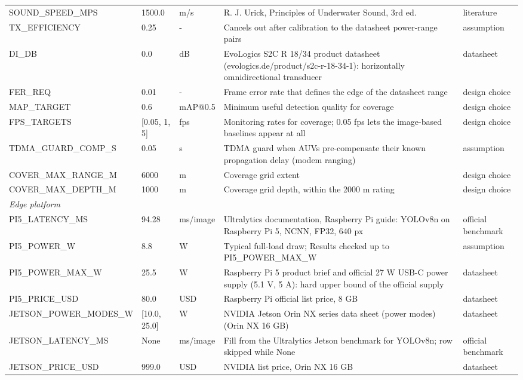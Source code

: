 \begin{table}[t]
\begin{tabular}{p{3.3cm}p{2.6cm}p{1.6cm}p{6.6cm}p{2.0cm}}
SOUND\_SPEED\_MPS & 1500.0 & m/s & R. J. Urick, Principles of Underwater Sound, 3rd ed. & literature \\
TX\_EFFICIENCY & 0.25 & - & Cancels out after calibration to the datasheet power-range pairs & assumption \\
DI\_DB & 0.0 & dB & EvoLogics S2C R 18/34 product datasheet (evologics.de/product/s2c-r-18-34-1): horizontally omnidirectional transducer & datasheet \\
FER\_REQ & 0.01 & - & Frame error rate that defines the edge of the datasheet range & design choice \\
MAP\_TARGET & 0.6 & mAP@0.5 & Minimum useful detection quality for coverage & design choice \\
FPS\_TARGETS & [0.05, 1, 5] & fps & Monitoring rates for coverage; 0.05 fps lets the image-based baselines appear at all & design choice \\
TDMA\_GUARD\_COMP\_S & 0.05 & s & TDMA guard when AUVs pre-compensate their known propagation delay (modem ranging) & assumption \\
COVER\_MAX\_RANGE\_M & 6000 & m & Coverage grid extent & design choice \\
COVER\_MAX\_DEPTH\_M & 1000 & m & Coverage grid depth, within the 2000 m rating & design choice \\
\multicolumn{5}{l}{\textit{Edge platform}} \\
PI5\_LATENCY\_MS & 94.28 & ms/image & Ultralytics documentation, Raspberry Pi guide: YOLOv8n on Raspberry Pi 5, NCNN, FP32, 640 px & official benchmark \\
PI5\_POWER\_W & 8.8 & W & Typical full-load draw; Results checked up to PI5\_POWER\_MAX\_W & assumption \\
PI5\_POWER\_MAX\_W & 25.5 & W & Raspberry Pi 5 product brief and official 27 W USB-C power supply (5.1 V, 5 A): hard upper bound of the official supply & datasheet \\
PI5\_PRICE\_USD & 80.0 & USD & Raspberry Pi official list price, 8 GB & datasheet \\
JETSON\_POWER\_MODES\_W & [10.0, 25.0] & W & NVIDIA Jetson Orin NX series data sheet (power modes) (Orin NX 16 GB) & datasheet \\
JETSON\_LATENCY\_MS & None & ms/image & Fill from the Ultralytics Jetson benchmark for YOLOv8n; row skipped while None & official benchmark \\
JETSON\_PRICE\_USD & 999.0 & USD & NVIDIA list price, Orin NX 16 GB & datasheet \\

\end{tabular}
\end{table}
